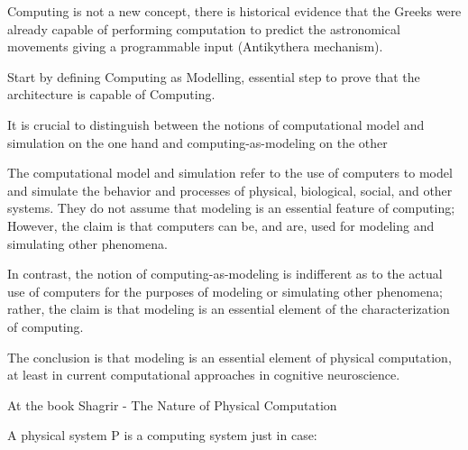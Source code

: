 \documentclass{article}
\begin{document}
Computing is not a new concept, there is historical evidence that the Greeks were already capable of performing computation to predict the astronomical movements giving a programmable input (Antikythera mechanism).

Start by defining Computing as Modelling, essential step to prove that the architecture is capable of Computing.

It is crucial to distinguish between the notions of computational model and simulation on the one hand and computing-as-modeling on the other

The computational model and simulation refer to the use of computers to model and simulate the behavior and processes of physical, biological, social, and other systems. They do not assume that modeling is an essential feature of computing; However, the claim is that computers can be, and are, used for modeling and simulating other phenomena.

In contrast, the notion of computing-as-modeling is indifferent as to the actual use of computers for the purposes of modeling or simulating other phenomena; rather, the claim is that modeling is an essential element of the characterization of computing.

The conclusion is that modeling is an essential element of physical computation, at least in current computational approaches in cognitive neuroscience.



At the book Shagrir - The Nature of Physical Computation \cite{shagrir2022nature}

A physical system P is a computing system just in case:
\end{document}
